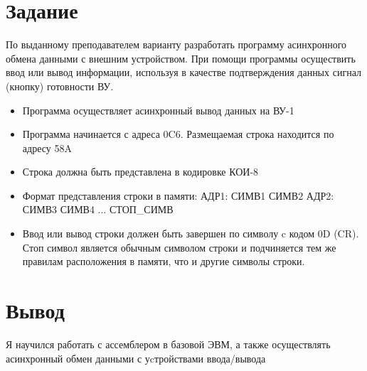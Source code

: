 \documentclass[12pt,a4paper]{report}
\begin{document}
\section*{Задание}
По выданному преподавателем варианту разработать программу асинхронного обмена данными с внешним устройством. При помощи программы осуществить ввод или вывод информации, используя в качестве подтверждения данных сигнал (кнопку) готовности ВУ.
\begin{itemize}
    \item Программа осуществляет асинхронный вывод данных на ВУ-1
    \item Программа начинается с адреса 0C6. Размещаемая строка находится по адресу 58A
    \item Строка должна быть представлена в кодировке КОИ-8
    \item Формат представления строки в памяти: АДР1: СИМВ1 СИМВ2 АДР2: СИМВ3 СИМВ4 ... СТОП\_СИМВ
    \item Ввод или вывод строки должен быть завершен по символу c кодом 0D (CR). Стоп символ является обычным символом строки и подчиняется тем же правилам расположения в памяти, что и другие символы строки.
\end{itemize}
\section*{Вывод}
Я научился работать с ассемблером в базовой ЭВМ, а также осуществлять асинхронный обмен данными с уcтройствами ввода/вывода
\end{document}
